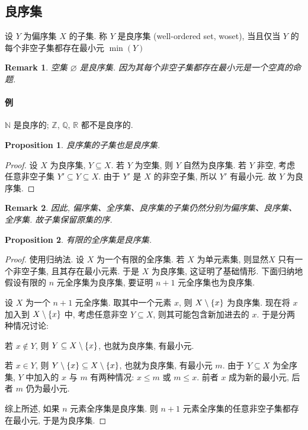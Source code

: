 \documentclass[UTF8]{ctexart}
\theoremstyle{mystyle}
\newtheorem{proposition}{Proposition}[section]
\theoremstyle{myremark}
\newtheorem*{remark}{Remark}
\theoremstyle{plain}
\newcommand{\R}{\mathbb R}
\newcommand{\Z}{\mathbb Z}
\newcommand{\N}{\mathbb N}
\newcommand{\Q}{\mathbb Q}
\DeclarePairedDelimiter\set{\{}{\}}
\begin{document}
\subsection{良序集}
\begin{definition}
    设 $ Y $ 为偏序集 $ X $ 的子集. 称 $ Y $ 是良序集 (well-ordered set, woset), 当且仅当 $ Y $ 的每个非空子集都存在最小元 $ \min(Y) $
\end{definition}

\begin{remark}
    空集 $ \varnothing $ 是良序集. 因为其每个非空子集都存在最小元是一个空真的命题.
\end{remark}


\paragraph{例}
$ \N $ 是良序的; $ \Z $, $ \Q $, $ \R $ 都不是良序的.

\begin{proposition}
    良序集的子集也是良序集.
\end{proposition}

\begin{proof}
    设 $ X $ 为良序集, $ Y \subseteq X $. 若 $ Y $ 为空集, 则 $ Y $ 自然为良序集. 若 $ Y $ 非空, 考虑任意非空子集 $ Y' \subseteq Y \subseteq X $. 由于 $ Y' $ 是 $ X $ 的非空子集, 所以 $ Y' $ 有最小元. 故 $ Y $ 为良序集.
\end{proof}

\begin{remark}
    因此, 偏序集、全序集、良序集的子集仍然分别为偏序集、良序集、全序集. 故子集保留原集的序.
\end{remark}

\begin{proposition}
    有限的全序集是良序集.
\end{proposition}

\begin{proof}
    使用归纳法. 设 $ X $ 为一个有限的全序集. 若 $ X $ 为单元素集, 则显然$ X $ 只有一个非空子集, 且其存在最小元素. 于是 $ X $ 为良序集, 这证明了基础情形. 下面归纳地假设有限的 $ n $ 元全序集为良序集, 要证明 $ n + 1 $ 元全序集也为良序集. 
    
    设 $ X $ 为一个 $ n + 1 $ 元全序集. 取其中一个元素 $ x $, 则 $ X \setminus \set{x} $ 为良序集. 现在将 $ x $ 加入到 $ X \setminus \set{x} $ 中, 考虑任意非空 $ Y \subseteq X $, 则其可能包含新加进去的 $ x $. 于是分两种情况讨论: 
    
    若 $ x \notin Y $, 则 $ Y \subseteq X \setminus \set{x} $, 也就为良序集, 有最小元.
    
    若 $ x \in Y $, 则 $ Y \setminus \set{x} \subseteq X \setminus \set{x} $, 也就为良序集, 有最小元 $ m $. 由于 $ Y \subseteq X $ 为全序集, $ Y $ 中加入的 $ x $ 与 $ m $ 有两种情况: $ x \le m $ 或 $ m \le x $. 前者 $ x $ 成为新的最小元, 后者 $ m $ 仍为最小元. 

    综上所述, 如果 $ n $ 元素全序集是良序集. 则 $ n + 1 $ 元素全序集的任意非空子集都存在最小元, 于是为良序集.
\end{proof}
\end{document}
